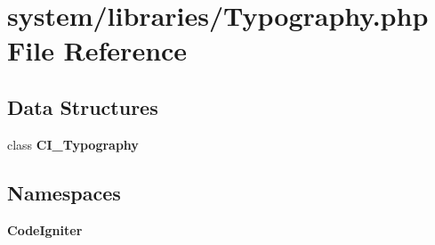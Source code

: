 \section{system/libraries/\-Typography.php File Reference}
\label{_typography_8php}
\subsection*{Data Structures}
\begin{DoxyCompactItemize}
\item 
class {\bf C\-I\-\_\-\-Typography}
\end{DoxyCompactItemize}
\subsection*{Namespaces}
\begin{DoxyCompactItemize}
\item 
{\bf Code\-Igniter}
\end{DoxyCompactItemize}
